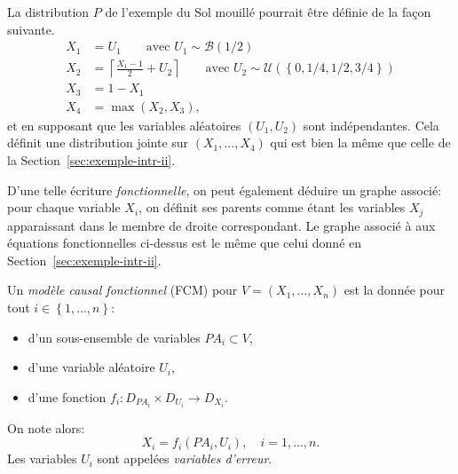 \begin{example}
  \label{ex:sol-mouille-fcm}
La distribution $P$ de l'exemple du Sol mouillé pourrait être définie
de la façon suivante.
\begin{align*}
X_1&=U_1\qquad \text{avec }U_1\sim \mathcal{B}(1/2)\\
X_2&=\left\lceil \frac{X_1-1}{2}+U_2 \right\rceil \qquad \text{avec }U_2\sim \mathcal{U}(\left\{ 0,1/4,1/2,3/4 \right\})\\
X_3&=1-X_1\\
X_4&=\max_{}(X_2,X_3),
\end{align*}
et en supposant que les variables aléatoires $(U_1,U_2)$ sont
indépendantes. Cela définit une distribution jointe sur
$(X_1,\dots,X_4)$ qui est bien la même que celle de la Section~\ref{sec:exemple-intr-ii}.

D'une telle écriture \emph{fonctionnelle}, on peut également déduire
un graphe associé: pour chaque variable $X_i$, on définit ses parents
comme étant les variables $X_j$ apparaissant dans le membre de droite
correspondant. Le graphe associé à aux équations fonctionnelles
ci-dessus est le même que celui donné en Section~\ref{sec:exemple-intr-ii}.
\end{example}

\begin{definition}
  Un \emph{modèle causal fonctionnel} (FCM) pour
  $V=(X_1,\dots,X_n)$ est la donnée pour tout $i\in \left\{ 1,\dots,n \right\}$:
\begin{itemize}
\item d'un sous-ensemble de variables $PA_i\subset V$,
\item d'une variable aléatoire $U_i$,
\item d'une fonction $f_i:D_{PA_i}\times D_{U_i}\to D_{X_i}$.
\end{itemize}
On note alors:
\begin{equation}
\label{eq:fcm}
X_i=f_i(PA_i,U_i),\quad i=1,\dots,n.
\end{equation}
Les variables $U_i$ sont appelées \emph{variables d'erreur}.
\end{definition}

